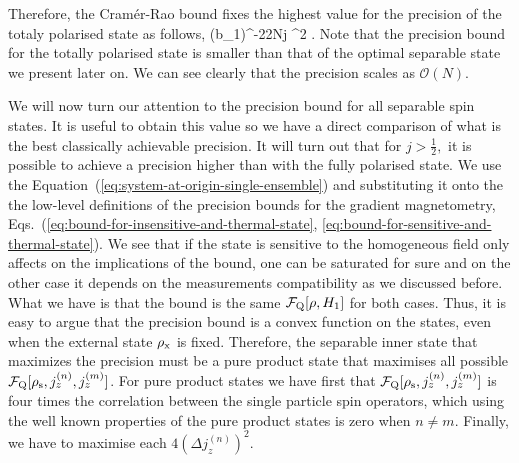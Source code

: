 Therefore, the Cram\'er-Rao bound fixes the highest value for the precision
of the totaly polarised state as follows,
\be
  (\Delta b_1)^{-2}\leq 2Nj \sigma^2 .
\ee
Note that the precision bound for the totally polarised state
is smaller than that of the optimal separable state we present later on.
We can see clearly that the precision scales as $\mathcal{O}(N).$


We will now turn our attention to
the precision bound for all separable spin states.
It is useful to obtain this value so we have a direct comparison of what is
the best classically achievable precision.
It will turn out that for $j>\frac{1}{2},$ it is possible
to achieve a precision higher than with the fully polarised state.
We use the Equation~(\ref{eq:system-at-origin-single-ensemble}) and substituting it onto the the low-level definitions of the precision bounds for the gradient magnetometry, Eqs.~(\ref{eq:bound-for-insensitive-and-thermal-state}, \ref{eq:bound-for-sensitive-and-thermal-state}).
We see that if the state is sensitive to the homogeneous field only affects on the implications of the bound, one can be saturated for sure and on the other case it depends on the measurements compatibility as we discussed before.
What we have is that the bound is the same $\mathcal{F}_{\textnormal{Q}}[{\textstyle \rho, H_1}]$ for both cases.
Thus, it is easy to argue that the precision bound is a convex function on the states, even when the external state $\rho_{\rm x}$ is fixed.
Therefore, the separable inner state that maximizes the precision must be a pure product state that maximises all possible $\mathcal{F}_{\textnormal{Q}}[{\textstyle \rho_{\rm s}, j_z^{(n)}, j_z^{(m)}}]$.%
For pure product states we have first that $\mathcal{F}_{\textnormal{Q}}[{\textstyle \rho_{\rm s}, j_z^{(n)}, j_z^{(m)}}]$ is four times the correlation between the single particle spin operators, which using the well known properties of the pure product states is  zero when $n \neq m$.
Finally, we have to maximise each $4(\Delta j_z^{(n)})^2$.


